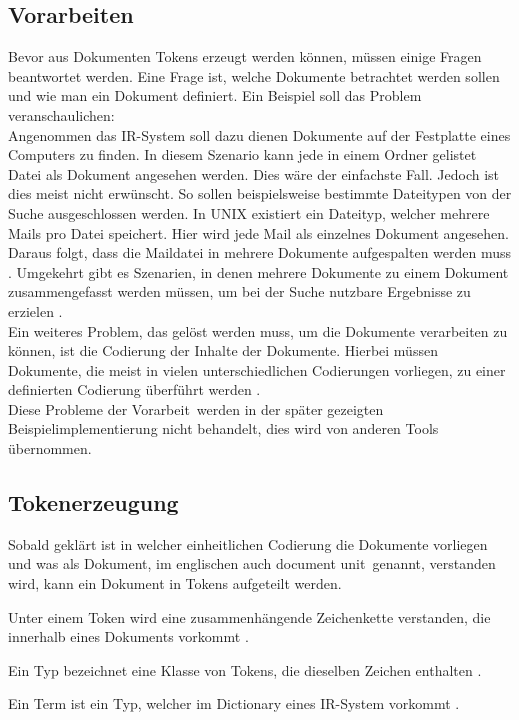 \subsection{Vorarbeiten}
Bevor aus Dokumenten Tokens erzeugt werden können, müssen einige Fragen beantwortet werden.
Eine Frage ist, welche Dokumente betrachtet werden sollen und wie man ein Dokument definiert. Ein Beispiel soll das Problem veranschaulichen:
\\
Angenommen das IR-System soll dazu dienen Dokumente auf der Festplatte eines Computers zu finden. In diesem Szenario kann jede in einem Ordner gelistet Datei als Dokument angesehen werden. Dies wäre der einfachste Fall. Jedoch ist dies meist nicht erwünscht. So sollen beispielsweise bestimmte Dateitypen von der Suche ausgeschlossen werden. In UNIX existiert ein Dateityp, welcher mehrere Mails pro Datei speichert. Hier wird jede Mail als einzelnes Dokument angesehen. Daraus folgt, dass die Maildatei in mehrere Dokumente aufgespalten werden muss \cite{IR_Intro_Cambridge}.
Umgekehrt gibt es Szenarien, in denen mehrere Dokumente zu einem Dokument zusammengefasst werden müssen, um bei der Suche nutzbare Ergebnisse zu erzielen \cite{IR_Intro_Cambridge}.
\\
Ein weiteres Problem, das gelöst werden muss, um die Dokumente verarbeiten zu können, ist die Codierung der Inhalte der Dokumente. Hierbei müssen Dokumente, die meist in vielen unterschiedlichen Codierungen vorliegen, zu einer definierten Codierung überführt werden \cite{IR_Intro_Cambridge}.
\\
Diese Probleme der \glqq Vorarbeit\grqq\ werden in der später gezeigten Beispielimplementierung nicht behandelt, dies wird von anderen Tools übernommen.

\subsection{Tokenerzeugung}
Sobald geklärt ist in welcher einheitlichen Codierung die Dokumente vorliegen und was als Dokument, im englischen auch \glqq document unit\grqq\ genannt, verstanden wird, kann ein Dokument in Tokens aufgeteilt werden.
\begin{defi}[Token]\label{def:Token}
	Unter einem Token wird eine zusammenhängende Zeichenkette verstanden, die innerhalb eines Dokuments vorkommt \cite{IR_Intro_Cambridge}.
\end{defi}
\begin{defi}[Typ]\label{def:Typ}
	Ein Typ bezeichnet eine Klasse von Tokens, die dieselben Zeichen enthalten \cite{IR_Intro_Cambridge}.
\end{defi}
\begin{defi}[Term]\label{def:Term}
	Ein Term ist ein Typ, welcher im Dictionary eines IR-System vorkommt \cite{IR_Intro_Cambridge}.
\end{defi}

